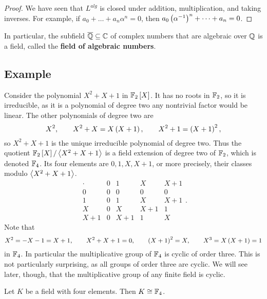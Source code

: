 \begin{proof}
We have seen that $ L^{alg} $ is closed under addition, multiplication, and taking inverses. For example, if $ a_0 + \dots + a_n\alpha^n = 0 $, then $ a_0\br{\alpha^{-1}}^n + \dots + a_n = 0 $.
\end{proof}

\begin{example*}
In particular, the subfield $ \overline{\mathbb{Q}} \subseteq \mathbb{C} $ of complex numbers that are algebraic over $ \mathbb{Q} $ is a field, called the \textbf{field of algebraic numbers}.
\end{example*}

\subsection{Example}

\begin{example*}
Consider the polynomial $ X^2 + X + 1 $ in $ \F_2\sbr{X} $. It has no roots in $ \mathbb{F}_2 $, so it is irreducible, as it is a polynomial of degree two any nontrivial factor would be linear. The other polynomials of degree two are
$$ X^2, \qquad X^2 + X = X\br{X + 1}, \qquad X^2 + 1 = \br{X + 1}^2, $$
so $ X^2 + X + 1 $ is the unique irreducible polynomial of degree two. Thus the quotient $ \F_2\sbr{X} / \abr{X^2 + X + 1} $ is a field extension of degree two of $ \mathbb{F}_2 $, which is denoted $ \mathbb{F}_4 $. Its four elements are $ 0, 1, X, X + 1 $, or more precisely, their classes modulo $ \left\langle X^2 + X + 1 \right\rangle $.
$$
\begin{array}{c|cccc}
\cdot & 0 & 1 & X & X + 1 \\
\hline
0 & 0 & 0 & 0 & 0 \\
1 & 0 & 1 & X & X + 1 \\
X & 0 & X & X + 1 & 1 \\
X + 1 & 0 & X + 1 & 1 & X
\end{array}.
$$
Note that
$$ X^2 = -X - 1 = X + 1, \qquad X^2 + X + 1 = 0, \qquad \br{X + 1}^2 = X, \qquad X^3 = X\br{X + 1} = 1 $$
in $ \mathbb{F}_4 $. In particular the multiplicative group of $ \mathbb{F}_4 $ is cyclic of order three. This is not particularly surprising, as all groups of order three are cyclic. We will see later, though, that the multiplicative group of any finite field is cyclic.
\end{example*}

\begin{proposition}
Let $ K $ be a field with four elements. Then $ K \cong \mathbb{F}_4 $.
\end{proposition}

